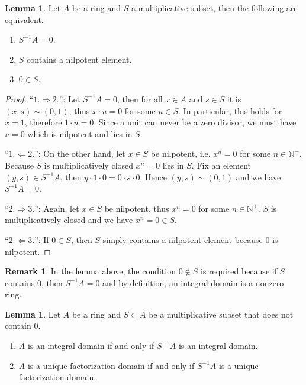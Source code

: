 \documentclass[a4paper]{book}
\theoremstyle{definition}
\newtheorem{lemma}[definition]{Lemma}
\newtheorem*{remark}{Remark}
\begin{document}
\begin{thmbox}
    \begin{lemma}
        Let \(A\) be a ring and \(S\) a multiplicative subset, then the following are equivalent.
        \begin{enumerate}
            \item \(S^{-1}A = 0\).
            \item \(S\) contains a nilpotent element.
            \item \(0 \in S\).
        \end{enumerate}
    \end{lemma}
\end{thmbox}
\begin{proof}
    ``\(1. \Rightarrow 2.\)'': Let \(S^{-1}A = 0\), then for all \(x \in A\) and \(s \in S\) it is \((x, s) \sim (0, 1)\), thus \(x \cdot u = 0\) for some \(u \in S\). In particular, this holds for \(x = 1\), therefore \(1 \cdot u = 0\). Since a unit can never be a zero divisor, we must have \(u = 0\) which is nilpotent and lies in \(S\).

    ``\(1. \Leftarrow 2.\)'': On the other hand, let \(x \in S\) be nilpotent, i.e. \(x^n = 0\) for some \(n \in \mathbb{N}^+\). Because \(S\) is multiplicatively closed \(x^n = 0\) lies in \(S\). Fix an element \((y, s) \in S^{-1}A\), then \(y \cdot 1 \cdot 0 = 0 \cdot s \cdot 0\). Hence \((y, s) \sim (0, 1)\) and we have \(S^{-1}A = 0\).

    ``\(2. \Rightarrow 3.\)'': Again, let \(x \in S\) be nilpotent, thus \(x^n = 0\) for some \(n \in \mathbb{N}^+\). \(S\) is multiplicatively closed and we have \(x^n = 0 \in S\).

    ``\(2. \Leftarrow 3.\)'': If \(0 \in S\), then \(S\) simply contains a nilpotent element because \(0\) is nilpotent.
\end{proof}


\begin{rembox}
    \begin{remark}
        In the lemma above, the condition \(0 \not\in S\) is required because if \(S\) contains \(0\), then \(S^{-1}A = 0\) and by definition, an integral domain is a nonzero ring.
    \end{remark}
\end{rembox}


\begin{thmbox}
    \begin{lemma}
        Let \(A\) be a ring and \(S \subset A\) be a multiplicative subset that does not contain \(0\).
        
        \begin{enumerate}
            \item \(A\) is an integral domain if and only if \(S^{-1}A\) is an integral domain.
            \item \(A\) is a unique factorization domain if and only if \(S^{-1}A\) is a unique factorization domain.
        \end{enumerate}
    \end{lemma}
\end{thmbox}
\end{document}
